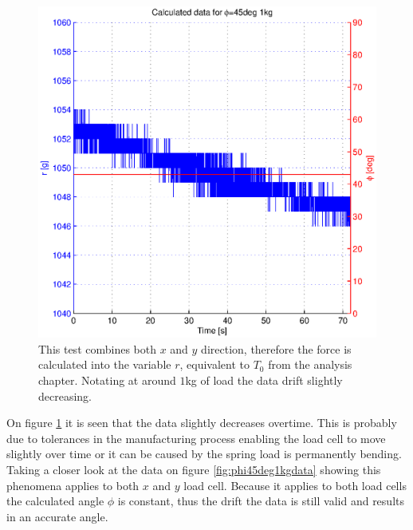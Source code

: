 \begin{figure}[hbtp]
\centering
\includegraphics[scale=1]{graphics/gcs_test/phi45deg1kg.eps}
\caption[Test combines both $x$ and $y$ direction]{This test combines both $x$ and $y$ direction, therefore the force is calculated into the variable $r$, equivalent to $T_0$ from the analysis chapter. Notating at around $1$kg of load the data drift slightly decreasing.}
\label{fig:phi45deg1kg}
\end{figure}

\noindent
On figure \ref{fig:phi45deg1kg} it is seen that the data slightly decreases overtime. This is probably due to tolerances in the manufacturing process enabling the load cell to move slightly over time or it can be caused by the spring load is permanently bending. Taking a closer look at the data on figure \ref{fig:phi45deg1kgdata} showing this phenomena applies to both $x$ and $y$ load cell. Because it applies to both load cells the calculated angle $\phi$ is constant, thus the drift the data is still valid and results in an accurate angle.

